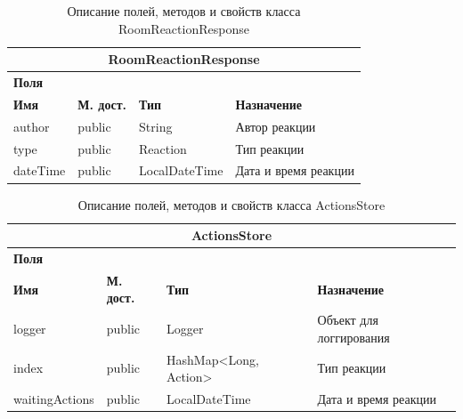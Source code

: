 \documentclass{../includes/TechDoc}
\begin{document}
    \begin{table}[h]
        \caption{\label{tab:class-WebsocketEventListener-table}Описание полей, методов и свойств класса RoomReactionResponse}
        \begin{tabularx}{\textwidth}{|l|l|l|X|}
            \hline
            \multicolumn{4}{|c|}{RoomReactionResponse} \\ \hline
            \multicolumn{4}{|l|}{\textbf{Поля}} \\ \hline
            \textbf{Имя} & \textbf{М. дост.} & \textbf{Тип}  & \textbf{Назначение}  \\ \hline
            author       & public            & String        & Автор реакции        \\ \hline
            type         & public            & Reaction      & Тип реакции          \\ \hline
            dateTime     & public            & LocalDateTime & Дата и время реакции \\ \hline
        \end{tabularx}
    \end{table}

    \begin{table}[h]
        \caption{\label{tab:class-WebsocketEventListener-table}Описание полей, методов и свойств класса ActionsStore}
        \begin{tabularx}{\textwidth}{|l|l|l|X|}
            \hline
            \multicolumn{4}{|c|}{ActionsStore} \\ \hline
            \multicolumn{4}{|l|}{\textbf{Поля}} \\ \hline
            \textbf{Имя}   & \textbf{М. дост.} & \textbf{Тип}          & \textbf{Назначение}     \\ \hline
            logger         & public            & Logger                & Объект для логгирования \\ \hline
            index          & public            & HashMap<Long, Action> & Тип реакции             \\ \hline
            waitingActions & public            & LocalDateTime         & Дата и время реакции    \\ \hline
        \end{tabularx}
    \end{table}
\end{document}
